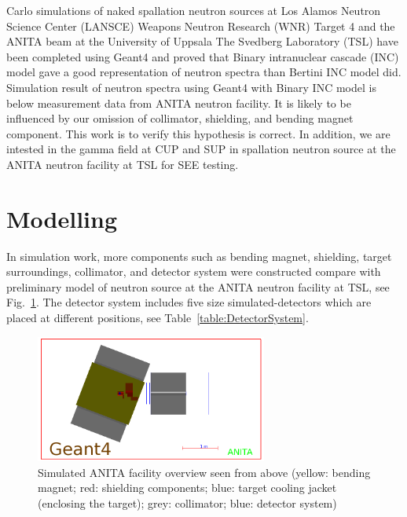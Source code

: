 \documentclass[12pt,journal]{IEEEtran}
\let\MYoriglatexcaption\caption
\renewcommand{\caption}[2][\relax]{\MYoriglatexcaption[#2]{#2}}
\begin{document}
 Carlo simulations of naked spallation neutron sources at Los Alamos Neutron Science Center (LANSCE) Weapons Neutron Research (WNR) Target 4\cite{Wender87} and the ANITA beam at the University of Uppsala The Svedberg Laboratory (TSL) have been completed using Geant4 and proved that Binary intranuclear cascade (INC) model gave a good representation of neutron spectra than Bertini INC model did\cite{Platt13}. Simulation result of neutron spectra using Geant4 with Binary INC model is below measurement data from ANITA neutron facility. It is likely to be influenced by our omission of collimator, shielding, and bending magnet component. This work is to verify this hypothesis is correct. In addition, we are intested in the gamma field at CUP and SUP in spallation neutron source at the ANITA neutron facility at TSL for SEE testing. 

\section{Modelling}

In simulation work, more components such as bending magnet, shielding, target surroundings, collimator, and detector system were constructed compare with preliminary model of neutron source at the ANITA neutron facility at TSL, see Fig.~\ref{fig:ANITAoverview}. 
The detector system includes five size simulated-detectors which are placed at different positions, see Table~\ref{table:DetectorSystem}. 

\begin{figure}[!t]
	\centering
	\includegraphics[width=3in]{overview.png}
	\caption{Simulated ANITA facility overview seen from above (yellow: bending magnet; red: shielding components; blue: target cooling jacket (enclosing the target); grey: collimator; blue: detector system)}
	\label{fig:ANITAoverview}
\end{figure}
\end{document}
